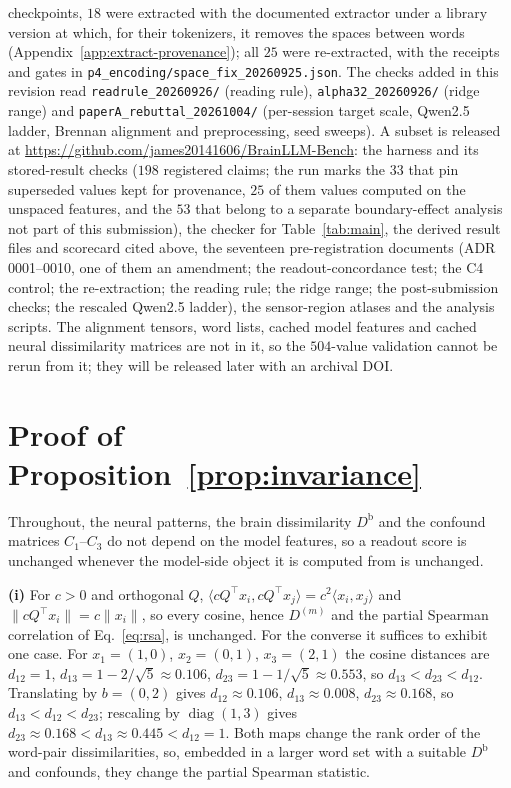 \documentclass{article}
\newcommand{\coderepo}{\url{https://github.com/james20141606/BrainLLM-Bench}}
\begin{document}
checkpoints, $18$ were extracted with the documented extractor under a library version at which,
for their tokenizers, it removes the spaces between words (Appendix~\ref{app:extract-provenance});
all $25$ were re-extracted, with the receipts and gates in
\texttt{p4\_encoding/space\_fix\_20260925.json}. The checks added in this revision read
\texttt{readrule\_20260926/} (reading rule), \texttt{alpha32\_20260926/} (ridge range) and
\texttt{paperA\_rebuttal\_20261004/} (per-session target scale, Qwen2.5 ladder, Brennan alignment and
preprocessing, seed sweeps). A subset is released at \coderepo: the harness and its stored-result checks ($198$ registered claims; the run marks the $33$ that pin superseded values kept for provenance,
$25$ of them values computed on the unspaced features, and the $53$ that belong to a separate
boundary-effect analysis not part of this submission), the checker for Table~\ref{tab:main}, the
derived result files and scorecard cited above, the seventeen pre-registration documents (ADR 0001--0010, one of them an amendment; the readout-concordance test; the C4 control; the re-extraction; the reading rule; the ridge range; the post-submission checks; the rescaled Qwen2.5 ladder), the sensor-region
atlases and the analysis scripts. The alignment tensors, word lists, cached model features and
cached neural dissimilarity matrices are not in it, so the $504$-value validation cannot be rerun from
it; they will be released later with an archival DOI.




\appendix
\section{Proof of Proposition~\ref{prop:invariance}}\label{app:proof}

Throughout, the neural patterns, the brain dissimilarity $D^{\mathrm b}$ and the confound
matrices $C_1$--$C_3$ do not depend on the model features, so a readout score is unchanged whenever
the model-side object it is computed from is unchanged.

\textbf{(i)} For $c>0$ and orthogonal $Q$, $\langle cQ^\top x_i, cQ^\top x_j\rangle=c^2\langle
x_i,x_j\rangle$ and $\|cQ^\top x_i\|=c\|x_i\|$, so every cosine, hence $D^{(m)}$ and the partial
Spearman correlation of Eq.~\eqref{eq:rsa}, is unchanged. For the converse it suffices to exhibit
one case. For $x_1=(1,0)$, $x_2=(0,1)$, $x_3=(2,1)$ the cosine distances are
$d_{12}=1$, $d_{13}=1-2/\sqrt5\approx0.106$, $d_{23}=1-1/\sqrt5\approx0.553$, so
$d_{13}<d_{23}<d_{12}$. Translating by $b=(0,2)$ gives $d_{12}\approx0.106$, $d_{13}\approx0.008$,
$d_{23}\approx0.168$, so $d_{13}<d_{12}<d_{23}$; rescaling by $\operatorname{diag}(1,3)$ gives
$d_{23}\approx0.168<d_{13}\approx0.445<d_{12}=1$. Both maps change the rank order of the word-pair
dissimilarities, so, embedded in a larger word set with a suitable $D^{\mathrm b}$ and confounds, they
change the partial Spearman statistic.
\end{document}
